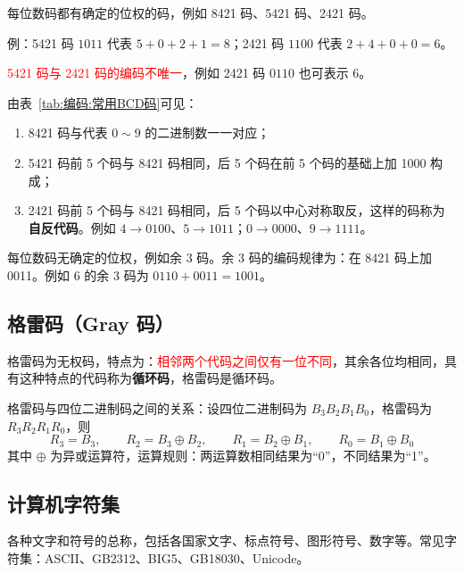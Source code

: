 \begin{definition}[有权 BCD 码]
	\label{def:有权BCD码}
	每位数码都有确定的位权的码，例如 8421 码、5421 码、2421 码。

	例：5421 码 $1011$ 代表 $5+0+2+1=8$；2421 码 $1100$ 代表 $2+4+0+0=6$。

	\textcolor{red}{5421 码与 2421 码的编码不唯一}，例如 2421 码 $0110$ 也可表示 6。
\end{definition}

由表~\ref{tab:编码:常用BCD码}可见：
\begin{enumerate}
	\item 8421 码与代表 $0\sim9$ 的二进制数一一对应；
	\item 5421 码前 5 个码与 8421 码相同，后 5 个码在前 5 个码的基础上加 1000 构成；
	\item 2421 码前 5 个码与 8421 码相同，后 5 个码以中心对称取反，这样的码称为\textbf{自反代码}。例如 $4\to0100$、$5\to1011$；$0\to0000$、$9\to1111$。
\end{enumerate}

\begin{definition}[无权 BCD 码（余 3 码）]
	\label{def:余三码}
	每位数码无确定的位权，例如余 3 码。余 3 码的编码规律为：在 8421 码上加 0011。例如 6 的余 3 码为 $0110+0011=1001$。
\end{definition}

\subsection{格雷码（Gray 码）}
\label{sec:格雷码}

格雷码为无权码，特点为：\textcolor{red}{相邻两个代码之间仅有一位不同}，其余各位均相同，具有这种特点的代码称为\textbf{循环码}，格雷码是循环码。

格雷码与四位二进制码之间的关系：设四位二进制码为 $B_3B_2B_1B_0$，格雷码为 $R_3R_2R_1R_0$，则
\begin{equation}
	R_3=B_3,\qquad R_2=B_3\oplus B_2,\qquad R_1=B_2\oplus B_1,\qquad R_0=B_1\oplus B_0
	\label{eq:编码:格雷码}
\end{equation}
其中 $\oplus$ 为异或运算符，运算规则：两运算数相同结果为“0”，不同结果为“1”。

\subsection{计算机字符集}
\label{sec:计算机字符集}

各种文字和符号的总称，包括各国家文字、标点符号、图形符号、数字等。常见字符集：ASCII、GB2312、BIG5、GB18030、Unicode。
